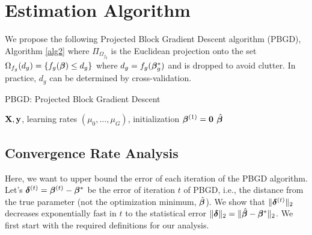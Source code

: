
\section{Estimation Algorithm}
\label{sec:opt}
We propose the following Projected Block Gradient Descent algorithm (PBGD), Algorithm \ref{alg2} where $\Pi_{\Omega_{f_g}}$ is the Euclidean projection onto the set $\Omega_{f_g}(d_g) = \{f_g(\boldsymbol{\beta}) \leq d_g\}$ where $d_g = f_g(\boldsymbol{\beta}_g^*)$ and is dropped to avoid clutter. In practice, $d_g$ can be determined by cross-validation.

\begin{algorithm}[t]
	\caption{  PBGD: {\sc Projected Block Gradient Descent}}
	\label{alg2}
	\begin{algorithmic}[1]
		 $\mathbf{X}, \mathbf{y}$, learning rates $(\mu_0, \dots, \mu_G)$, initialization $\boldsymbol{\beta} ^{(1)} = \mathbf{0}$
		 $\hat{\boldsymbol{\beta}}$
		\ENDFOR
		\ENDFOR
	\end{algorithmic}
\end{algorithm}



\subsection{Convergence Rate Analysis}

Here, we want to upper bound the error of each iteration of the PBGD algorithm.
Let's $\boldsymbol{\delta}^{(t)} = \boldsymbol{\beta}^{(t)} - \boldsymbol{\beta}^*$ be the error of  iteration $t$ of PBGD, i.e., the distance from the true parameter (not the optimization minimum, $\hat{\boldsymbol{\beta}}$).
We show that $\|\boldsymbol{\delta}^{(t)}\|_{2}$ decreases exponentially fast in $t$ to the statistical error $\|\boldsymbol{\delta}\|_{2} = \|\hat{\boldsymbol{\beta}} - \boldsymbol{\beta}^*\|_{2}$.
We first start with the required definitions for our analysis.

